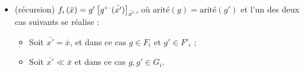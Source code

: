 \begin{definition}[$a$-LSRS]
\begin{itemize}[itemsep=-1mm]
					\item 	(récursion)		$f_i\left(\bar{x}\right) = g'\left[ g^{\leftarrow}(\bar{x'}) \right]_{\bar{x'}}$, où $\text{arité}(g) = \text{arité}(g')$ et l'un des deux cas suivants se réalise :
							\begin{itemize}[itemsep=-1mm]
								\item 	Soit $\bar{x'} = \bar{x}$, et dans ce cas $g \in F_i$ et $g' \in F'_i$ ;
								\item 	Soit $\bar{x'} \ll \bar{x}$ et dans ce cas $g, g' \in G_i$. 
							\end{itemize}
%						
%						
				\end{itemize}
				
			\end{definition}
			
